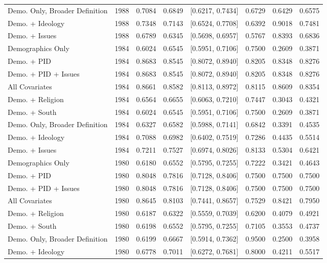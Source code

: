 \begin{longtable}{lrrrlrrr}
  Demo. Only, Broader Definition & 1988 & 0.7084 & 0.6849 & [0.6217, 0.7434] & 0.6729 & 0.6429 & 0.6575 \\ 
  Demo. + Ideology & 1988 & 0.7348 & 0.7143 & [0.6524, 0.7708] & 0.6392 & 0.9018 & 0.7481 \\ 
  Demo. + Issues & 1988 & 0.6789 & 0.6345 & [0.5698, 0.6957] & 0.5767 & 0.8393 & 0.6836 \\ 
  Demographics Only & 1984 & 0.6024 & 0.6545 & [0.5951, 0.7106] & 0.7500 & 0.2609 & 0.3871 \\ 
  Demo. + PID & 1984 & 0.8683 & 0.8545 & [0.8072, 0.8940] & 0.8205 & 0.8348 & 0.8276 \\ 
  Demo. + PID + Issues & 1984 & 0.8683 & 0.8545 & [0.8072, 0.8940] & 0.8205 & 0.8348 & 0.8276 \\ 
  All Covariates & 1984 & 0.8661 & 0.8582 & [0.8113, 0.8972] & 0.8115 & 0.8609 & 0.8354 \\ 
  Demo. + Religion & 1984 & 0.6564 & 0.6655 & [0.6063, 0.7210] & 0.7447 & 0.3043 & 0.4321 \\ 
  Demo. + South & 1984 & 0.6024 & 0.6545 & [0.5951, 0.7106] & 0.7500 & 0.2609 & 0.3871 \\ 
  Demo. Only, Broader Definition & 1984 & 0.6327 & 0.6582 & [0.5988, 0.7141] & 0.6842 & 0.3391 & 0.4535 \\ 
  Demo. + Ideology & 1984 & 0.7088 & 0.6982 & [0.6402, 0.7519] & 0.7286 & 0.4435 & 0.5514 \\ 
  Demo. + Issues & 1984 & 0.7211 & 0.7527 & [0.6974, 0.8026] & 0.8133 & 0.5304 & 0.6421 \\ 
  Demographics Only & 1980 & 0.6180 & 0.6552 & [0.5795, 0.7255] & 0.7222 & 0.3421 & 0.4643 \\ 
  Demo. + PID & 1980 & 0.8048 & 0.7816 & [0.7128, 0.8406] & 0.7500 & 0.7500 & 0.7500 \\ 
  Demo. + PID + Issues & 1980 & 0.8048 & 0.7816 & [0.7128, 0.8406] & 0.7500 & 0.7500 & 0.7500 \\ 
  All Covariates & 1980 & 0.8645 & 0.8103 & [0.7441, 0.8657] & 0.7529 & 0.8421 & 0.7950 \\ 
  Demo. + Religion & 1980 & 0.6187 & 0.6322 & [0.5559, 0.7039] & 0.6200 & 0.4079 & 0.4921 \\ 
  Demo. + South & 1980 & 0.6198 & 0.6552 & [0.5795, 0.7255] & 0.7105 & 0.3553 & 0.4737 \\ 
  Demo. Only, Broader Definition & 1980 & 0.6199 & 0.6667 & [0.5914, 0.7362] & 0.9500 & 0.2500 & 0.3958 \\ 
  Demo. + Ideology & 1980 & 0.6778 & 0.7011 & [0.6272, 0.7681] & 0.8000 & 0.4211 & 0.5517 \\ 

\end{longtable}
